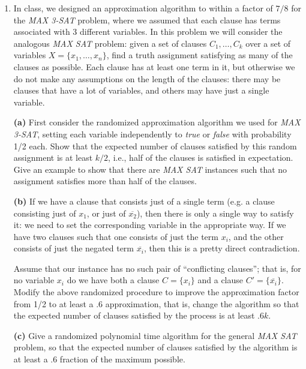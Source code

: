 \documentclass[12pt]{article}
\begin{document}
\begin{enumerate}
{}


\item

In class, we designed an approximation algorithm to within
a factor of $7/8$ for the {\em MAX 3-SAT} problem,
where we assumed  that each clause has terms
associated with 3 different variables.
In this problem we will consider the analogous {\em MAX SAT} problem:
given a set of clauses $C_1,\ldots, C_k$  over a set of variables
$X=\{x_1,\ldots, x_n\}$, find a truth assignment satisfying as many of
the clauses as possible. Each clause has at least one term in it,
but otherwise we do not make any assumptions on the length of
the clauses: there may be clauses that have a lot of variables, and
others may have just a single variable.

\medskip
{\bf (a)} First consider the randomized approximation algorithm we used for
{\em MAX 3-SAT}, setting each variable independently to {\em true} or
{\em false} with probability 1/2 each. Show that the expected number
of clauses satisfied by this random assignment is at least $k/2$, i.e.,
half of the clauses is satisfied in expectation. Give an example to show
that there are {\em MAX SAT} instances such that no assignment satisfies more
than half of the clauses.

\medskip
{\bf (b)} If we have a clause that consists just of a single
term (e.g. a clause consisting just of $x_1$, or just of $\overline{x_2}$),
then there is only a single way to satisfy it:
we need to set the corresponding variable in the appropriate way.
If we have two clauses such that one consists of just
the term $x_i$, and the other consists of just the negated term
$\overline{x_i}$, then this is a pretty direct contradiction.

Assume that our instance has no such pair of ``conflicting clauses'';
that is, for no variable $x_i$
do we have both a clause $C=\{x_i\}$ and a clause $C'=\{\overline{x_i}\}$.
Modify the above randomized procedure to improve the approximation factor
from 1/2 to at least a .6 approximation, that is, change the algorithm so
that the expected number of clauses satisfied by the process is at least $.6k$.

\medskip
{\bf (c)} Give a randomized polynomial time algorithm for the general
{\em MAX SAT} problem, so that the expected number of clauses satisfied
by the algorithm is at least a .6 fraction of the maximum possible.


\end{enumerate}
\end{document}
